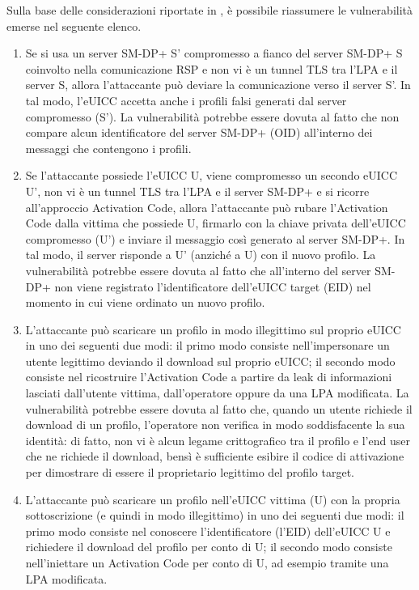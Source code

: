 \documentclass[10pt, oneside]{book}
\begin{document}
\noindent Sulla base delle considerazioni riportate in \cite{Sec-analysis}, è possibile riassumere le vulnerabilità emerse nel seguente elenco.
\begin{enumerate}
\item Se si usa un server SM-DP+ S' compromesso a fianco del server SM-DP+ S coinvolto nella comunicazione RSP e non vi è un tunnel TLS tra l'LPA e il server S, allora l'attaccante può deviare la comunicazione verso il server S'. In tal modo, l'eUICC accetta anche i profili falsi generati dal server compromesso (S'). La vulnerabilità potrebbe essere dovuta al fatto che non compare alcun identificatore del server SM-DP+ (OID) all'interno dei messaggi che contengono i profili.
\item Se l'attaccante possiede l'eUICC U, viene compromesso un secondo eUICC U', non vi è un tunnel TLS tra l'LPA e il server SM-DP+ e si ricorre all'approccio Activation Code, allora l'attaccante può rubare l'Activation Code dalla vittima che possiede U, firmarlo con la chiave privata dell'eUICC compromesso (U') e inviare il messaggio così generato al server SM-DP+. In tal modo, il server risponde a U' (anziché a U) con il nuovo profilo. La vulnerabilità potrebbe essere dovuta al fatto che all'interno del server SM-DP+ non viene registrato l'identificatore dell'eUICC target (EID) nel momento in cui viene ordinato un nuovo profilo.
\item L'attaccante può scaricare un profilo in modo illegittimo sul proprio eUICC in uno dei seguenti due modi: il primo modo consiste nell'impersonare un utente legittimo deviando il download sul proprio eUICC; il secondo modo consiste nel ricostruire l'Activation Code a partire da leak di informazioni lasciati dall'utente vittima, dall'operatore oppure da una LPA modificata. La vulnerabilità potrebbe essere dovuta al fatto che, quando un utente richiede il download di un profilo, l'operatore non verifica in modo soddisfacente la sua identità: di fatto, non vi è alcun legame crittografico tra il profilo e l'end user che ne richiede il download, bensì è sufficiente esibire il codice di attivazione per dimostrare di essere il proprietario legittimo del profilo target.
\item L'attaccante può scaricare un profilo nell'eUICC vittima (U) con la propria sottoscrizione (e quindi in modo illegittimo) in uno dei seguenti due modi: il primo modo consiste nel conoscere l'identificatore (l'EID) dell'eUICC U e richiedere il download del profilo per conto di U; il secondo modo consiste nell'iniettare un Activation Code per conto di U, ad esempio tramite una LPA modificata.

\end{enumerate}
\end{document}
